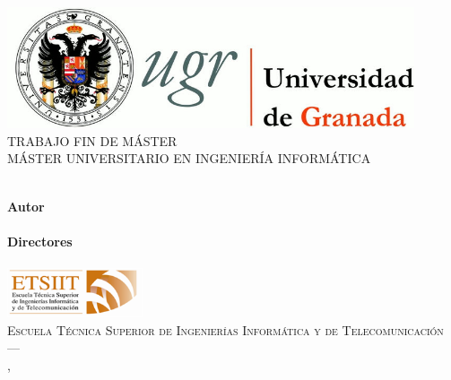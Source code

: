 \begin{titlepage}
 
 
\newlength{\centeroffset}
\setlength{\centeroffset}{-0.5\oddsidemargin}
\addtolength{\centeroffset}{0.5\evensidemargin}
\thispagestyle{empty}

\noindent\hspace*{\centeroffset}\begin{minipage}{\textwidth}

\centering
\includegraphics[width=0.9\textwidth]{imagenes/logo_ugr.jpg}\\[1.4cm]

\textsc{ \Large TRABAJO FIN DE MÁSTER\\[0.2cm]}
\textsc{ MÁSTER UNIVERSITARIO EN INGENIERÍA INFORMÁTICA}\\[1cm]
% 
{\LARGE\bfseries \myTitle\\
}
\end{minipage}

\vspace{2.5cm}
\noindent\hspace*{\centeroffset}\begin{minipage}{\textwidth}
\centering

\textbf{Autor}\\ \myName\\[2.5ex]
\textbf{Directores}\\
\myProf\\[2cm]
\includegraphics[width=0.3\textwidth]{imagenes/etsiit_logo.png}\\[0.1cm]
\textsc{Escuela Técnica Superior de Ingenierías Informática y de Telecomunicación}\\
\textsc{---}\\
\myLocation, \myTime
\end{minipage}
\end{titlepage}


